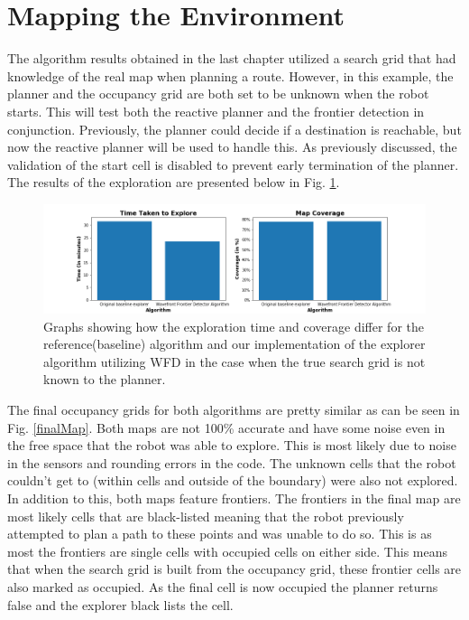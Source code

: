 \documentclass[a4paper,12pt]{article}
\begin{document}
	
	
	\section{Mapping the Environment}
		The algorithm results obtained in the last chapter utilized a search grid that had knowledge of the real map when planning a route. However, in this example, the planner and the occupancy grid are both set to be unknown when the robot starts. This will test both the reactive planner and the frontier detection in conjunction. Previously, the planner could decide if a destination is reachable, but now the reactive planner will be used to handle this. As previously discussed, the validation of the start cell is disabled to prevent early termination of the planner. The results of the exploration are presented below in Fig. \ref{Part3}. 

		\begin{figure}[H]
			\centering
			\includegraphics[scale=0.5]{images/Part3.png}
			\caption{Graphs showing how the exploration time and coverage differ for the reference(baseline) algorithm and our implementation of the explorer algorithm utilizing WFD in the case when the true search grid is not known to the planner.}
			\label{Part3}
		\end{figure}

		The final occupancy grids for both algorithms are pretty similar as can be seen in Fig. \ref{finalMap}. Both maps are not 100\% accurate  and have some noise even in the free space that the robot was able to explore. This is most likely due to noise in the sensors and rounding errors in the code. The unknown cells that the robot couldn't get to (within cells and outside of the boundary) were also not explored. In addition to this, both maps feature frontiers. The frontiers in the final map are most likely cells that are black-listed meaning that the robot previously attempted to plan a path to these points and was unable to do so. This is as most the frontiers are single cells with occupied cells on either side. This means that when the search grid is built from the occupancy grid, these frontier cells are also marked as occupied. As the final cell is now occupied the planner returns false and the explorer black lists the cell.
\end{document}
